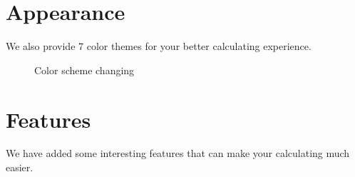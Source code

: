 \documentclass[a5paper, 11pt]{article}
\begin{document}
\section{Appearance}
    We also provide 7 color themes for your better calculating experience.
    \begin{figure}[h]
        \centering
        \caption{Color scheme changing}
        \label{fig:UI_Main_Window_02}
    \end{figure}

\pagebreak

\section{Features}
    We have added some interesting features that can make your calculating much easier.
\end{document}
